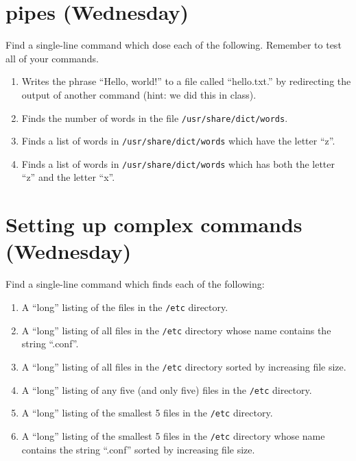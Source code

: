\documentclass{article}
\begin{document}
\section{pipes (Wednesday)}

Find a single-line command which dose each of the following.  Remember to test all of your commands.
\begin{enumerate}[a]

\item Writes the phrase ``Hello, world!'' to a file called ``hello.txt.'' by redirecting the output of another command (hint:  we did this in class).
\item Finds the number of words in the file \texttt{/usr/share/dict/words}.
\item Finds a list of words in \texttt{/usr/share/dict/words} which have the letter ``z''.
\item Finds a list of words in \texttt{/usr/share/dict/words} which has both the letter ``z'' and the letter ``x''.

\end{enumerate}

\section{Setting up complex commands (Wednesday)}
Find a single-line command which finds each of the following:
\begin{enumerate}

\item A ``long'' listing of the files in the \texttt{/etc} directory.
\item A ``long'' listing of all files in the \texttt{/etc} directory whose name contains the string ``.conf''.
\item A ``long'' listing of all files in the \texttt{/etc} directory sorted by increasing file size.
\item A ``long'' listing of any five (and only five) files in the \texttt{/etc} directory.
\item A ``long'' listing of the smallest 5 files in the \texttt{/etc} directory.
\item A ``long'' listing of the smallest 5 files in the \texttt{/etc} directory whose name contains the string ``.conf'' sorted by increasing file size.

\end{enumerate}
\end{document}
